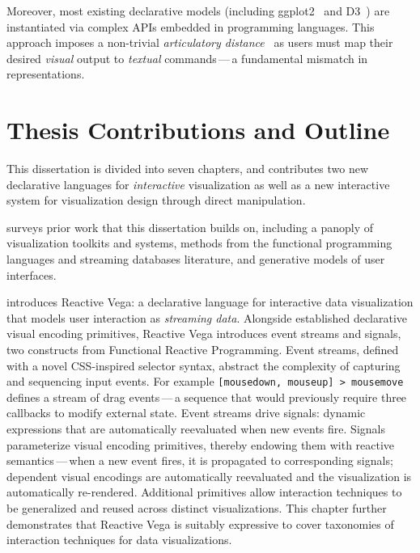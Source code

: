 Moreover, most existing declarative models (including
ggplot2~\cite{wickham:layered} and D3~\cite{bostock:d3}) are instantiated via
complex APIs embedded in programming languages. This approach imposes a
non-trivial \emph{articulatory distance}~\cite{hutchins:directmanip} as users
must map their desired \emph{visual} output to \emph{textual} commands\,---\,a
fundamental mismatch in representations.

\section{Thesis Contributions and Outline}

This dissertation is divided into seven chapters, and contributes two new
declarative languages for \emph{interactive} visualization as well as a new
interactive system for visualization design through direct manipulation.

 surveys prior work that this dissertation builds on,
including a panoply of visualization toolkits and systems, methods from the
functional programming languages and streaming databases literature, and
generative models of user interfaces.

 introduces Reactive Vega: a declarative language for
interactive data visualization that models user interaction as \emph{streaming
data}. Alongside established declarative visual encoding primitives, Reactive
Vega introduces event streams and signals, two constructs from Functional
Reactive Programming. Event streams, defined with a novel CSS-inspired selector
syntax, abstract the complexity of capturing and sequencing input events. For
example \texttt{[mousedown, mouseup] > mousemove} defines a stream of drag
events\,---\,a sequence that would previously require three callbacks to modify
external state. Event streams drive signals: dynamic expressions that are
automatically reevaluated when new events fire. Signals parameterize visual
encoding primitives, thereby endowing them with reactive semantics\,---\,when a
new event fires, it is propagated to corresponding signals; dependent visual
encodings are automatically reevaluated and the visualization is automatically
re-rendered. Additional primitives allow interaction techniques to be
generalized and reused across distinct visualizations. This chapter further
demonstrates that Reactive Vega is suitably expressive to cover taxonomies of
interaction techniques for data visualizations.

